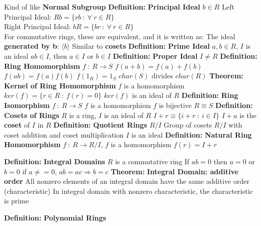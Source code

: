 \documentclass[14pt]{extarticle}
\def\Definition{{\color{blue} \textbf{Definition:} }}
\def\Theorem{{\color{red} \textbf{Theorem:} }}
\begin{document}
\begin{outline}
			\2	Kind of like \textbf{Normal Subgroup}
		\1	\Definition \textbf{Principal Ideal}
			\2	$b \in R$
			\2	Left Principal Ideal:	$Rb = \{rb~:~\forall~r \in R\}$ \\
			\2	Right Principal Ideal:	$bR = \{br~:~\forall~r \in R\}$ \\	
			\2	For commutative rings, these are equivalent, and it is written as:
					The ideal \textbf{generated by b}: $\langle b \rangle$
			\2	Similar to \textbf{cosets}
		\1	\Definition \textbf{Prime Ideal}
			\2	$a,b \in R$, $I$ is an ideal
			\2	$ab \in I$, then $a \in I$ or $b \in I$
		\1	\Definition \textbf{Proper Ideal}
			\2	$I \ne R$	
		\1	\Definition \textbf{Ring Homomorphism}
			\2	$f~:~R \rightarrow S$
			\2	$f(a + b) = f(a) + f(b)$
			\2	$f(ab) = f(a)f(b)$
			\2	$f(1_R) = 1_S$
			\2	$char(S)$ divides $char(R)$
		\1	\Theorem \textbf{Kernel of Ring Homomorphism}
			\2	$f$ is a homomorphism
			\2	$ker(f) = \{r \in R~:~f(r) = 0\}$
			\2	{\color{purple} $ker(f)$ is an ideal of $R$}
		\1	\Definition \textbf{Ring Isomorphism}
			\2	$f~:~R \rightarrow S$
			\2	$f$ is a homomorphism	
			\2	$f$ is bijective
			\2	$R \cong S$
		\1	\Definition \textbf{Cosets of Rings}
			\2	$R$ is a ring, $I$ is an ideal of $R$
			\2	$I + r \equiv \{i + r~:~i \in I\}$
			\2	$I + a$ is the \textbf{coset} of $I$ in $R$	
		\1	\Definition \textbf{Quotient Rings} $R/I$
			\2	Group of cosets $R/I$ with coset addition and coset multiplication
			\2	$I$ is an ideal
		\1	\Definition \textbf{Natural Ring Homomorphism}
			\2	$f~:~R \rightarrow R/I$, $f$ is a homomorphism
			\2	{\color{purple} $f(r) = I + r$}
	
		\1	\Definition \textbf{Integral Domains}
			\2	$R$ is a commutative ring
			\2	If $ab = 0$ then $a = 0$ or $b = 0$
			\2	if $a \ne = 0$, $ab = ac \Rightarrow b = c$
		\1	\Theorem	\textbf{Integral Domain: additive order}
			\2	{\color{purple} All nonzero elements of an integral domain have the same additive order (characteristic)}
			\2	{\color{purple} In integral domain with nonzero characteristic, the characteristic is prime}
		
		\1	\Definition \textbf{Polynomial Rings}

	\end{outline}
\end{document}
